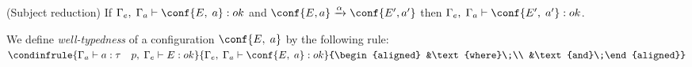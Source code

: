 \begin{theorem} (Subject reduction)
If $\Gamma_e, \;\Gamma_a \vdash \conf{E,\;a} : ok$ and $\conf{E, a} \xrightarrow{\alpha} \conf{E', a'}$ then $\Gamma_e, \;\Gamma_a \vdash \conf{E',\;a'} : ok$.
\end{theorem}

We define \textit{well-typedness} of a configuration $\conf{E,\;a}$ by the following rule: \\
$\condinfrule{\Gamma_a \vdash a : \tau \quad p,\; \Gamma_e \vdash E : ok}{\Gamma_e, \;\Gamma_a \vdash \conf{E,\;a} : ok}{\begin{align*}
        &\text{where}\;\\
        &\text{and}\;\end{align*}}$
        
        
